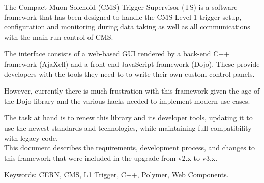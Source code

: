 The Compact Muon Solenoid (CMS) Trigger Supervisor (TS) is a software framework that has been designed to
handle the CMS Level-1 trigger setup, configuration and monitoring during data
taking as well as all communications with the main run control of CMS.

The interface consists of a web-based GUI rendered by a back-end C++ framework
(AjaXell) and a front-end JavaScript framework (Dojo).
These provide developers with the tools they need to to write their own custom
control panels.

However, currently there is much frustration with this framework given the age
of the Dojo library and the various hacks needed to implement modern use cases.

The task at hand is to renew this library and its developer tools, updating it
to use the newest standards and technologies, while maintaining full
compatibility with legacy code.\\

This document describes the requirements, development process, and changes to
this framework that were included in the upgrade from v2.x to v3.x.

\underline{Keywords:} CERN, CMS, L1 Trigger, C++, Polymer, Web Components.
